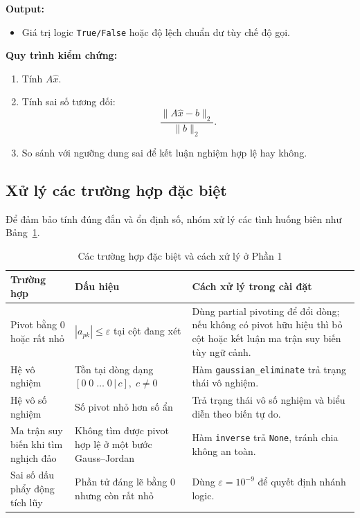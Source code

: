 \documentclass[a4paper]{article}
\begin{document}
\textbf{Output:}
\begin{itemize}
    \item Giá trị logic \texttt{True/False} hoặc độ lệch chuẩn dư tùy chế độ gọi.
\end{itemize}

\textbf{Quy trình kiểm chứng:}
\begin{enumerate}
    \item Tính \(A\hat{x}\).
    \item Tính sai số tương đối:
    \[
    \frac{\|A\hat{x}-b\|_2}{\|b\|_2}.
    \]
    \item So sánh với ngưỡng dung sai để kết luận nghiệm hợp lệ hay không.
\end{enumerate}

\subsection{Xử lý các trường hợp đặc biệt}

Để đảm bảo tính đúng đắn và ổn định số, nhóm xử lý các tình huống biên như Bảng~\ref{tab:part1_edge_cases}.

\begin{table}[H]
\centering
\small
\begin{tabular}{|p{}|p{}|p{}|}
\hline
\textbf{Trường hợp} & \textbf{Dấu hiệu} & \textbf{Cách xử lý trong cài đặt} \\ \hline
Pivot bằng 0 hoặc rất nhỏ & \(|a_{pk}| \le \varepsilon\) tại cột đang xét & Dùng partial pivoting để đổi dòng; nếu không có pivot hữu hiệu thì bỏ cột hoặc kết luận ma trận suy biến tùy ngữ cảnh. \\ \hline
Hệ vô nghiệm & Tồn tại dòng dạng \([0\;0\;\dots\;0\,|\,c],\; c\neq 0\) & Hàm \texttt{gaussian\_eliminate} trả trạng thái vô nghiệm. \\ \hline
Hệ vô số nghiệm & Số pivot nhỏ hơn số ẩn & Trả trạng thái vô số nghiệm và biểu diễn theo biến tự do. \\ \hline
Ma trận suy biến khi tìm nghịch đảo & Không tìm được pivot hợp lệ ở một bước Gauss--Jordan & Hàm \texttt{inverse} trả \texttt{None}, tránh chia không an toàn. \\ \hline
Sai số dấu phẩy động tích lũy & Phần tử đáng lẽ bằng 0 nhưng còn rất nhỏ & Dùng \(\varepsilon = 10^{-9}\) để quyết định nhánh logic. \\ \hline
\end{tabular}
\caption{Các trường hợp đặc biệt và cách xử lý ở Phần 1}
\label{tab:part1_edge_cases}
\end{table}
\end{document}
